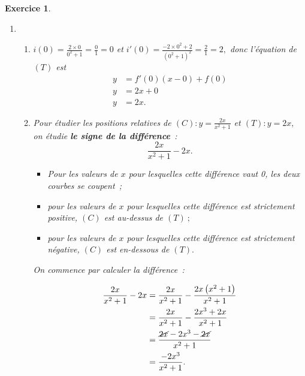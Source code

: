 \documentclass[10pt]{article}
\newtheorem{exo}{Exercice}
\begin{document}
\begin{exo}
\begin{enumerate}
\begin{multicols}{2}
\end{multicols}


\item
\begin{enumerate}
\item $i(0)=\frac{2\times 0}{0^2+1}=\frac{0}{1}=0$ et $i'(0)=\frac{-2\times 0^2+2}{\left(0^2+1\right)^2}=\frac{2}{1}=2,$ donc l'équation de $(T)$ est
\begin{align*}
y&=f'(0)(x-0)+f(0)\\
y&=2x+0\\
y&=2x.\end{align*}

\item Pour étudier les positions relatives de $(C):y=\frac{2x}{x^2+1}$ et $(T):y=2x,$ on étudie \textbf{le signe de la différence}~:
\[\frac{2x}{x^2+1}-2x.\]
\begin{itemize}
\item[\textbullet] Pour les valeurs de $x$ pour lesquelles cette différence vaut 0, les deux courbes se coupent~;
\item[\textbullet] pour les valeurs de $x$ pour lesquelles cette différence est strictement positive, $(C)$ est au-dessus de $(T)~;$
\item[\textbullet] pour les valeurs de $x$ pour lesquelles cette différence est strictement négative, $(C)$ est en-dessous de $(T).$
\end{itemize}


\medskip

On commence par calculer la différence~:

\begin{align*}
\frac{2x}{x^2+1}-2x
&= \frac{2x}{x^2+1}-\frac{2x\left(x^2+1\right)}{x^2+1}
\\&=\frac{2x}{x^2+1}-\frac{2x^3+2x}{x^2+1}
\\&=\frac{\cancel{2x}-2x^3-\cancel{2x}}{x^2+1}
\\&=\frac{-2x^3}{x^2+1}.
\end{align*}

\medskip

\footnotesize
\setlength{\columnseprule}{1pt}

\begin{multicols}{2}


\end{multicols}
\end{enumerate}
\end{enumerate}
\end{exo}
\end{document}
